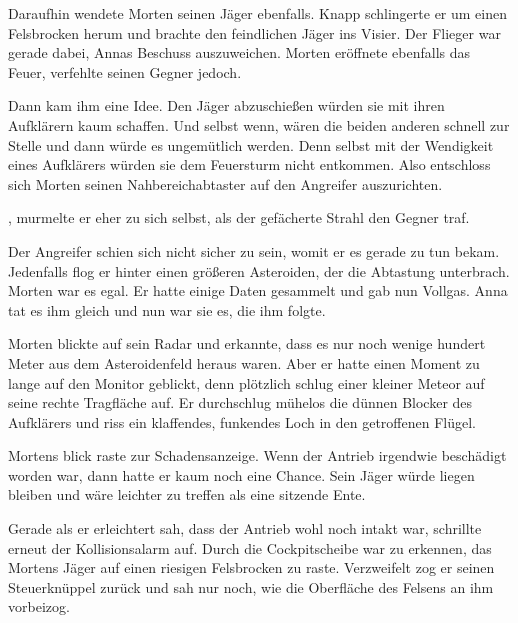 \par

Daraufhin wendete Morten seinen Jäger ebenfalls. Knapp schlingerte er um einen Felsbrocken herum und brachte den feindlichen Jäger ins Visier. Der Flieger war gerade dabei, Annas Beschuss auszuweichen. Morten eröffnete ebenfalls das Feuer, verfehlte seinen Gegner jedoch.

\par

Dann kam ihm eine Idee. Den Jäger abzuschießen würden sie mit ihren Aufklärern kaum schaffen. Und selbst wenn, wären die beiden anderen schnell zur Stelle und dann würde es ungemütlich werden. Denn selbst mit der Wendigkeit eines Aufklärers würden sie dem Feuersturm nicht entkommen. Also entschloss sich Morten seinen Nahbereichabtaster auf den Angreifer auszurichten.

\par

, murmelte er eher zu sich selbst, als der gefächerte Strahl den Gegner traf.

\par

Der Angreifer schien sich nicht sicher zu sein, womit er es gerade zu tun bekam. Jedenfalls flog er hinter einen größeren Asteroiden, der die Abtastung unterbrach. Morten war es egal. Er hatte einige Daten gesammelt und gab nun Vollgas. Anna tat es ihm gleich und nun war sie es, die ihm folgte.

\par

Morten blickte auf sein Radar und erkannte, dass es nur noch wenige hundert Meter aus dem Asteroidenfeld heraus waren. Aber er hatte einen Moment zu lange auf den Monitor geblickt, denn plötzlich schlug einer kleiner Meteor auf seine rechte Tragfläche auf. Er durchschlug mühelos die dünnen Blocker des Aufklärers und riss ein klaffendes, funkendes Loch in den getroffenen Flügel.

\par

Mortens blick raste zur Schadensanzeige. Wenn der Antrieb irgendwie beschädigt worden war, dann hatte er kaum noch eine Chance. Sein Jäger würde liegen bleiben und wäre leichter zu treffen als eine sitzende Ente.

\par

Gerade als er erleichtert sah, dass der Antrieb wohl noch intakt war, schrillte erneut der Kollisionsalarm auf. Durch die Cockpitscheibe war zu erkennen, das Mortens Jäger auf einen riesigen Felsbrocken zu raste. Verzweifelt zog er seinen Steuerknüppel zurück und sah nur noch, wie die Oberfläche des Felsens an ihm vorbeizog.


